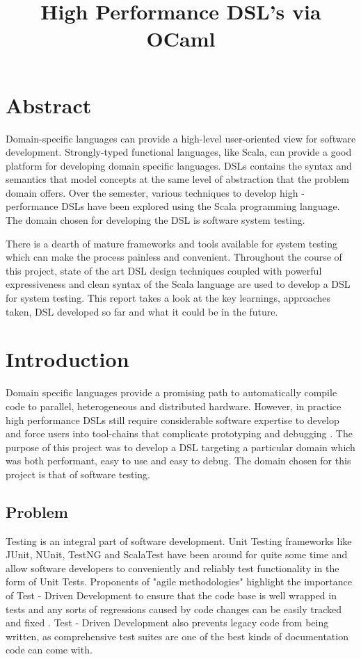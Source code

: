 \documentclass[12 pt]{article}
\title{High Performance DSL's via OCaml}
\begin{document}

\maketitle

\vspace{-10 mm}
\tableofcontents

\newpage
\section{Abstract}
Domain-specific languages can provide a high-level user-oriented view for software development. Strongly-typed functional languages, like Scala, can provide a good platform for developing domain specific languages. DSLs contains the syntax and semantics that model concepts at the same level of abstraction that the problem domain offers. Over the semester, various techniques to develop high - performance DSLs have been explored using the Scala programming language. The domain chosen for developing the DSL is software system testing.
\bigskip

\noindent
There is a dearth of mature frameworks and tools available for system testing which can make the process painless and convenient. Throughout the course of this project, state of the art DSL design techniques coupled with powerful expressiveness and clean syntax of the Scala language are used to develop a DSL for system testing. This report takes a look at the key learnings, approaches taken, DSL developed so far and what it could be in the future.

\newpage
\section{Introduction}

\noindent
Domain specific languages provide a promising path to automatically compile code to parallel, heterogeneous and distributed hardware. However, in practice high performance DSLs still require considerable software expertise to develop and force users into tool-chains that complicate  prototyping and debugging \cite{delite}. The purpose of this project was to develop a DSL targeting a particular domain which was both performant, easy to use and easy to debug. The domain chosen for this project is that of software testing.

\subsection{Problem}
Testing is an integral part of software development. Unit Testing frameworks like JUnit, NUnit, TestNG and ScalaTest have been around for quite some time and allow software developers to conveniently and reliably test functionality in the form of Unit Tests. Proponents of "agile methodologies" highlight the importance of Test - Driven Development to ensure that the code base is well wrapped in tests and any sorts of regressions caused by code changes can be easily tracked and fixed \cite{tdd}. Test - Driven Development also prevents legacy code from being written, as comprehensive test suites are one of the best kinds of documentation code can come with.
\bigskip
\end{document}
